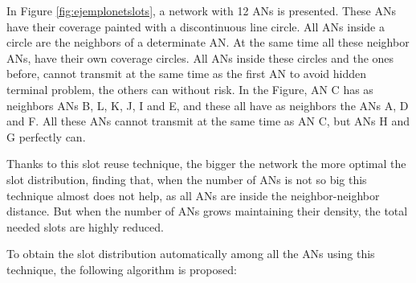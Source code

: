 In Figure \ref{fig:ejemplonetslots}, a network with 12 \acp{AN} is presented. These \acp{AN} have their coverage painted with a discontinuous line circle.
All \acp{AN} inside a circle are the neighbors of a determinate \ac{AN}. At the same time all these neighbor \acp{AN}, have their own coverage circles.
All \acp{AN} inside these circles and the ones before, cannot transmit at the same time as the first \ac{AN} to avoid hidden terminal problem, the others 
can without risk. In the Figure, \ac{AN} C has as neighbors \acp{AN} B, L, K, J, I and E, and these all have as neighbors the \acp{AN} A, D and F. All these
\acp{AN} cannot transmit at the same time as \ac{AN} C, but \acp{AN} H and G perfectly can.

Thanks to this slot reuse technique, the bigger the network the more optimal the slot distribution, finding that, when the number of \acp{AN} is not so big this 
technique almost does not help, as all \acp{AN} are inside the neighbor-neighbor distance. But when the number of \acp{AN} grows maintaining their density, 
the total needed slots are highly reduced.

To obtain the slot distribution automatically among all the \acp{AN} using this technique, the following algorithm is proposed:


